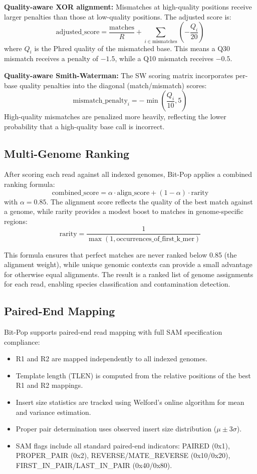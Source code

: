 \documentclass[utf8]{article}
\begin{document}
\textbf{Quality-aware XOR alignment:} Mismatches at high-quality positions receive larger penalties than those at low-quality positions. The adjusted score is:
\[
\text{adjusted\_score} = \frac{\text{matches}}{R} + \sum_{i \in \text{mismatches}} \left(-\frac{Q_i}{20}\right)
\]
where $Q_i$ is the Phred quality of the mismatched base. This means a Q30 mismatch receives a penalty of $-1.5$, while a Q10 mismatch receives $-0.5$.

\textbf{Quality-aware Smith-Waterman:} The SW scoring matrix incorporates per-base quality penalties into the diagonal (match/mismatch) scores:
\[
\text{mismatch\_penalty}_i = -\min\left(\frac{Q_i}{10}, 5\right)
\]
High-quality mismatches are penalized more heavily, reflecting the lower probability that a high-quality base call is incorrect.

\subsection{Multi-Genome Ranking}

After scoring each read against all indexed genomes, Bit-Pop applies a combined ranking formula:
\[
\text{combined\_score} = \alpha \cdot \text{align\_score} + (1 - \alpha) \cdot \text{rarity}
\]
with $\alpha = 0.85$. The alignment score reflects the quality of the best match against a genome, while rarity provides a modest boost to matches in genome-specific regions:
\[
\text{rarity} = \frac{1}{\max(1, \text{occurrences\_of\_first\_k\_mer})}
\]

This formula ensures that perfect matches are never ranked below 0.85 (the alignment weight), while unique genomic contexts can provide a small advantage for otherwise equal alignments. The result is a ranked list of genome assignments for each read, enabling species classification and contamination detection.

\subsection{Paired-End Mapping}

Bit-Pop supports paired-end read mapping with full SAM specification compliance:
\begin{itemize}
    \item R1 and R2 are mapped independently to all indexed genomes.
    \item Template length (TLEN) is computed from the relative positions of the best R1 and R2 mappings.
    \item Insert size statistics are tracked using Welford's online algorithm \citep{welford1962} for mean and variance estimation.
    \item Proper pair determination uses observed insert size distribution ($\mu \pm 3\sigma$).
    \item SAM flags include all standard paired-end indicators: PAIRED (0x1), PROPER\_PAIR (0x2), REVERSE/MATE\_REVERSE (0x10/0x20), FIRST\_IN\_PAIR/LAST\_IN\_PAIR (0x40/0x80).
\end{itemize}
\end{document}
